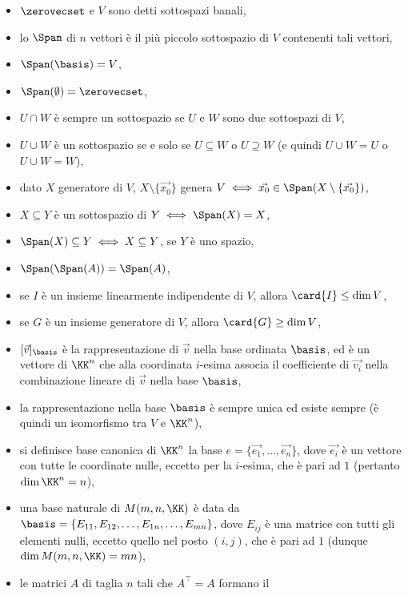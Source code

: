 \documentclass[10pt,landscape]{article}
\begin{document}
\begin{multicols}{3}
		\begin{itemize}
			\item $\zerovecset$ e $V$ sono detti sottospazi banali,
			\item lo $\Span$ di $n$ vettori è il più piccolo sottospazio
			di $V$ contenenti tali vettori,
			\item $\Span(\basis) = V$,
			\item $\Span(\emptyset) = \zerovecset$,
			\item $U \cap W$ è sempre un sottospazio se $U$ e $W$ sono due sottospazi di $V$,
			\item $U \cup W$ è un sottospazio se e solo se $U \subseteq W$ o $U \supseteq W$ (e quindi $U \cup W = U$ o $U \cup W = W$),
			\item dato $X$ generatore di $V$, $X \setminus \{\vec{x_0}\}$
			genera $V \iff \vec{x_0} \in \Span(X \setminus \{\vec{x_0}\})$,
			\item $X \subseteq Y$ è un sottospazio di $Y \iff \Span(X) = X$,
			\item $\Span(X) \subseteq Y \iff X \subseteq Y$, se $Y$ è uno spazio,
			\item $\Span(\Span(A)) = \Span(A)$,
			\item se $I$ è un insieme linearmente indipendente di $V$,
			allora $\card{I} \leq \dim V$,
			\item se $G$ è un insieme generatore di $V$, allora
			$\card{G} \geq \dim V$,
			\item $[\vec{v}]_\basis$ è la rappresentazione
			di $\vec{v}$ nella base ordinata $\basis$, ed è
			un vettore di $\KK^n$ che alla coordinata $i$-esima
			associa il coefficiente di $\vec{v_i}$ nella combinazione
			lineare di $\vec{v}$ nella base $\basis$,
			\item la rappresentazione nella base $\basis$ è sempre
			unica ed esiste sempre (è quindi un isomorfismo tra $V$ e
			$\KK^n$),
			\item si definisce base canonica di $\KK^n$ la base
			$e = \{\vec{e_1}, \ldots, \vec{e_n}\}$, dove
			$\vec{e_i}$ è un vettore con tutte le coordinate nulle,
			eccetto per la $i$-esima, che è pari ad $1$ (pertanto
			$\dim \KK^n = n$),
			\item una base naturale di $M(m, n, \KK)$ è data
			da $\basis = \{E_{11}, E_{12}, \ldots, E_{1n}, \ldots, E_{mn}\}$,
			dove $E_{ij}$ è una matrice con tutti gli elementi nulli, eccetto
			quello nel posto $(i, j)$, che è pari ad $1$ (dunque
			$\dim M(m, n, \KK) = mn$),
			\item le matrici $A$ di taglia $n$ tali che $A^\top = A$ formano il

\end{itemize}
\end{multicols}
\end{document}
